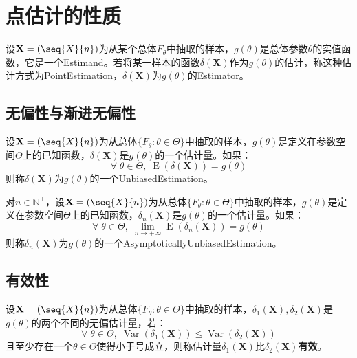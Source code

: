 \section{点估计的性质}

\begin{definition}
	设$\mathbf{X}=(\seq{X}{n})$为从某个总体$F_\theta$中抽取的样本，$g(\theta)$是总体参数$\theta$的实值函数，它是一个\gls{Estimand}。若将某一样本的函数$\delta(\mathbf{X})$作为$g(\theta)$的估计，称这种估计方式为\gls{PointEstimation}，$\delta(\mathbf{X})$为$g(\theta)$的\gls{Estimator}。
\end{definition}

\subsection{无偏性与渐进无偏性}
\begin{definition}
	设$\mathbf{X}=(\seq{X}{n})$为从总体$\{F_\theta:\theta\in\Theta\}$中抽取的样本，$g(\theta)$是定义在参数空间$\Theta$上的已知函数，$\delta(\mathbf{X})$是$g(\theta)$的一个估计量。如果：
	\begin{equation*}
		\forall\;\theta\in\Theta,\;\operatorname{E}(\delta(\mathbf{X}))=g(\theta)
	\end{equation*}
	则称$\delta(\mathbf{X})$为$g(\theta)$的一个\gls{UnbiasedEstimation}。
\end{definition}
\begin{definition}
	对$n\in\mathbb{N}^+$，设$\mathbf{X}=(\seq{X}{n})$为从总体$\{F_\theta:\theta\in\Theta\}$中抽取的样本，$g(\theta)$是定义在参数空间$\Theta$上的已知函数，$\delta_n(\mathbf{X})$是$g(\theta)$的一个估计量。如果：
	\begin{equation*}
		\forall\;\theta\in\Theta,\;\lim_{n\to+\infty}\operatorname{E}(\delta_n(\mathbf{X}))=g(\theta)
	\end{equation*}
	则称$\delta_n(\mathbf{X})$为$g(\theta)$的一个\gls{AsymptoticallyUnbiasedEstimation}。
\end{definition}

\subsection{有效性}
\begin{definition}
	设$\mathbf{X}=(\seq{X}{n})$为从总体$\{F_\theta:\theta\in\Theta\}$中抽取的样本，$\delta_1(\mathbf{X}),\delta_2(\mathbf{X})$是$g(\theta)$的两个不同的无偏估计量，若：
	\begin{equation*}
		\forall\;\theta\in\Theta,\;\operatorname{Var}(\delta_1(\mathbf{X}))\leqslant\operatorname{Var}(\delta_2(\mathbf{X}))
	\end{equation*}
	且至少存在一个$\theta\in\Theta$使得小于号成立，则称估计量$\delta_1(\mathbf{X})$比$\delta_2(\mathbf{X})$\textbf{有效}。
\end{definition}

